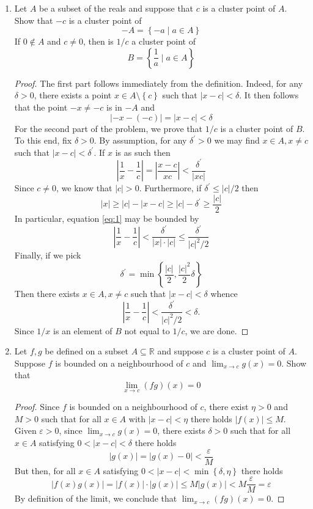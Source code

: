 \documentclass[12pt, reqno]{article}
\numberwithin{equation}{section}
\theoremstyle{definition}
\theoremstyle{remark}
\newcommand{\RR}{\mathbb{R}}
\newcommand{\set}[1]{\left\{#1\right\}}
\newcommand{\abs}[1]{\left\lvert#1\right\rvert}
\renewcommand{\epsilon}{\varepsilon}
\begin{document}
\begin{enumerate}[leftmargin=*]
	\item Let $A$ be a subset of the reals and suppose that $c$ is a cluster point of $A$. Show that $-c$ is a cluster point of
	      \[
		      -A = \set{-a \mid a\in A}
	      \]
	      If $0\not\in A$ and $c\neq 0$, then is $1/c$ a cluster point of
	      \[
		      B = \set{\frac{1}{a} \mid a\in A}
	      \]
	      \begin{proof}
		      The first part follows immediately from the definition. Indeed, for any $\delta>0$, there exists a point $x\in A\setminus\set{c}$ such that $\abs{x-c} < \delta$. It then follows that the point $-x \neq -c$ is in $-A$ and
		      \[
			      \abs{-x-(-c)} = \abs{x-c}  <\delta
		      \]
		      For the second part of the problem, we prove that $1/c$ is a cluster point of $B$. To this end, fix $\delta>0$. By assumption, for any $\delta^\prime>0$ we may find $x\in A, x\neq c$ such that $\abs{x-c} < \delta^\prime$. If $x$ is as such then
		      \begin{equation}\label{eq:1}
			      \abs{\frac{1}{x} - \frac{1}{c}} = \abs{\frac{x-c}{xc}} <\frac{\delta^\prime}{\abs{xc}}
		      \end{equation}
		      Since $c \neq 0$, we know that $\abs{c} > 0$. Furthermore, if $\delta^\prime \leq \abs{c}/2$ then
		      \[
			      \abs{x} \geq \abs{c} -  \abs{x-c} \geq \abs{c} - \delta^\prime \geq \frac{\abs{c}}{2}
		      \]
		      In particular, equation \eqref{eq:1} may be bounded by
		      \[
			      \abs{\frac{1}{x} - \frac{1}{c}} <\frac{\delta^\prime}{\abs{x}\cdot\abs{c}} \leq \frac{\delta^\prime}{\abs{c}^2/2}
		      \]
		      Finally, if we pick
		      \[
			      \delta^\prime = \min\set{\frac{\abs{c}}{2}, \frac{\abs{c}^2}{2}\delta}
		      \]
		      Then there exists $x\in A, x\neq c$ such that $\abs{x-c} < \delta$ whence
		      \[
			      \abs{\frac{1}{x} - \frac{1}{c}} < \frac{\delta^\prime}{\abs{c}^2/2} < \delta.
		      \]
		      Since $1/x$ is an element of $B$ not equal to $1/c$, we are done.
	      \end{proof}

	\item Let $f, g$ be defined on a subset $A\subseteq \RR$ and suppose $c$ is a cluster point of $A$. Suppose $f$ is bounded on a neighbourhood of $c$ and $\lim_{x\to c} g(x) = 0$. Show that
	      \[
		      \lim_{x\to c} (fg)(x) = 0
	      \]
	      \begin{proof}
		      Since $f$ is bounded on a neighbourhood of $c$, there exist $\eta>0$ and $M > 0$ such that for all $x\in A$ with $\abs{x-c} < \eta$ there holds $\abs{f(x)} \leq M$. Given $\epsilon > 0$, since $\lim_{x\to c} g(x) = 0$, there exists $\delta > 0$ such that for all $x\in A$ satisfying $0<\abs{x-c} < \delta$ there holds
		      \[
			      \abs{g(x)} = \abs{g(x) - 0} < \frac{\epsilon}{M}
		      \]
		      But then, for all $x\in A$ satisfying $0 < \abs{x-c} < \min\set{\delta, \eta}$ there holds
		      \[
			      \abs{f(x)g(x)} = \abs{f(x)} \cdot\abs{g(x)} \leq M\abs{g(x)} < M\frac{\epsilon}{M} = \epsilon
		      \]
		      By definition of the limit, we conclude that $\lim_{x\to c} (fg)(x) = 0$.
	      \end{proof}


\end{enumerate}
\end{document}
